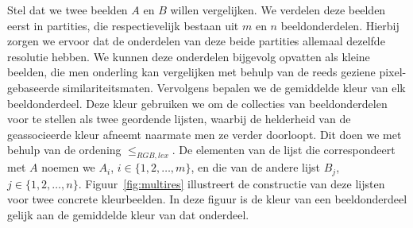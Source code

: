 Stel dat we twee beelden $A$ en $B$ willen
vergelijken. We verdelen
deze beelden eerst in partities, die respectievelijk bestaan uit
$m$ en $n$ beeldonderdelen. Hierbij zorgen we ervoor dat de onderdelen
van deze beide partities allemaal dezelfde resolutie hebben. We kunnen deze onderdelen bijgevolg 
opvatten als kleine beelden, die men onderling kan vergelijken met behulp van de reeds 
geziene pixel-gebaseerde similariteitsmaten.
Vervolgens bepalen we de gemiddelde kleur van elk beeldonderdeel. Deze kleur gebruiken we om
de collecties van beeldonderdelen voor te stellen als twee geordende lijsten, waarbij de 
helderheid van de geassocieerde kleur afneemt naarmate men ze verder doorloopt.
Dit doen we met behulp van de ordening $\leq_{RGB,lex}$. 
De elementen van de lijst die correspondeert met $A$ noemen 
we $A_i$, $i \in \{1,2,\ldots,m\}$, en die van de andere lijst $B_j$, $j \in \{1,2,\ldots,n\}$.
Figuur~\ref{fig:multires} illustreert de constructie van deze lijsten voor twee concrete
kleurbeelden. In deze figuur is de kleur van een beeldonderdeel gelijk aan de gemiddelde 
kleur van dat onderdeel.

